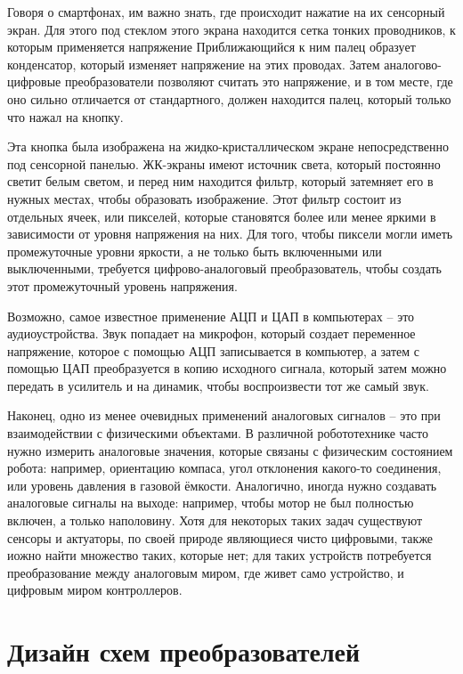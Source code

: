 \documentclass[a4page]{article}
\begin{document}
Говоря о смартфонах, им важно знать, где происходит нажатие на их сенсорный экран.
Для этого под стеклом этого экрана находится сетка тонких проводников, к которым применяется напряжение
Прибли\-жающийся к ним палец образует кон\-ден\-сатор, который изменяет напряжение на этих проводах.
Затем аналогово-\-цифровые пре\-образо\-ватели позволяют считать это напряжение,
и в том месте, где оно сильно отличается от стандартного,
должен находится палец, который только что нажал на кнопку.

Эта кнопка была изображена на жидко-кристаллическом экране непосредственно под сенсорной панелью.
ЖК-экраны имеют источник света, который постоянно светит белым светом,
и перед ним находится фильтр, который затемняет его в нужных местах,
чтобы образовать изображение.
Этот фильтр состоит из отдельных ячеек, или пикселей,
которые становятся более или менее яркими в зависимости от уровня напряжения на них.
Для того, чтобы пиксели могли иметь промежуточные уровни яркости,
а не только быть включенными или выключенными,
требуется цифрово-аналоговый преобразователь, чтобы создать этот промежуточный уровень напряжения.

Возможно, самое известное применение АЦП и ЦАП в компьютерах -- это аудиоустройства.
Звук попадает на микрофон, который создает переменное напряжение,
которое с помощью АЦП записывается в компьютер,
а затем с помощью ЦАП преобразуется в копию исходного сигнала,
который затем можно передать в усилитель и на динамик,
чтобы воспроизвести тот же самый звук.

Наконец, одно из менее очевидных применений аналоговых сигналов -- это при взаимодействии с физическими объектами.
В различной робототехнике часто нужно измерить аналоговые значения, которые связаны с физическим состоянием робота:
например, ориентацию компаса, угол отклонения какого-то соединения, или уровень давления в газовой ёмкости.
Аналогично, иногда нужно создавать аналоговые сигналы на выходе:
например, чтобы мотор не был полностью включен, а только наполовину.
Хотя для некоторых таких задач существуют сенсоры и актуаторы, по своей природе являющиеся чисто цифровыми,
также иожно найти множество таких, которые нет;
для таких устройств потребуется преобразование между аналог\-овым миром, где живет само устройство,
и цифровым миром кон\-троллеров.


\section{Дизайн схем преобразователей}
\end{document}
